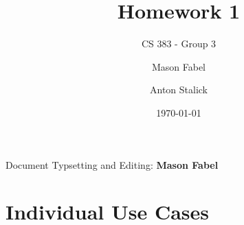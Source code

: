 \documentclass[12pt]{report}
\title{Homework 1}
\subtitle{CS 383 - Group 3}
\author{
Mason Fabel \\
\and Anton Stalick \\
}
\date{\today}
\newlength\tindent
\renewcommand{\indent}{\hspace*{\tindent}}
\begin{document}
\maketitle

\tableofcontents
Document Typsetting and Editing: \textbf{Mason Fabel}
\clearpage

\chapter{Individual Use Cases}






\end{document}
